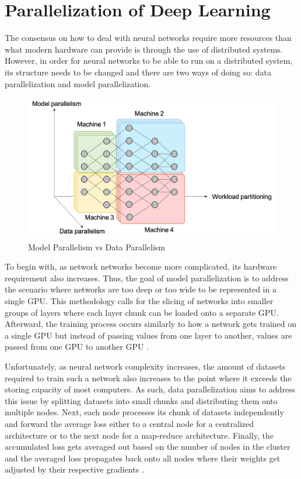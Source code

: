 \documentclass[conference]{IEEEtran}
\begin{document}
    \section{Parallelization of Deep Learning}
        The consensus on how to deal with neural networks require more resources than what modern hardware can provide is through the use of distributed systems. However, in order for neural networks to be able to run on a distributed system, its structure needs to be changed and there are two ways of doing so: data parallelization and model parallelization.

        \begin{figure}[!htb]
            \centering
            \captionsetup{justification=centering}
            \includegraphics[width=\linewidth]{Parallelism.png}
            \caption{Model Parallelism vs Data Parallelism \cite{ekanayake}}  
        \end{figure}

        To begin with, as network networks become more complicated, its hardware requirement also increases. Thus, the goal of model parallelization is to address the scenario where networks are too deep or too wide to be represented in a single GPU. This methodology calls for the slicing of networks into smaller groups of layers where each layer chunk can be loaded onto a separate GPU. Afterward, the training process occurs similarly to how a network gets trained on a single GPU but instead of passing values from one layer to another, values are passed from one GPU to another GPU \cite{ben-nun_hoefler_2019}.

        Unfortunately, as neural network complexity increases, the amount of datasets required to train such a network also increases to the point where it exceeds the storing capacity of most computers. As such, data parallelization aims to address this issue by splitting datasets into small chunks and distributing them onto multiple nodes. Next, each node processes its chunk of datasets independently and forward the average loss either to a central node for a centralized architecture or to the next node for a map-reduce architecture. Finally, the accumulated loss gets averaged out based on the number of nodes in the cluster and the averaged loss propagates back onto all nodes where their weights get adjusted by their respective gradients \cite{ben-nun_hoefler_2019}.
\end{document}
